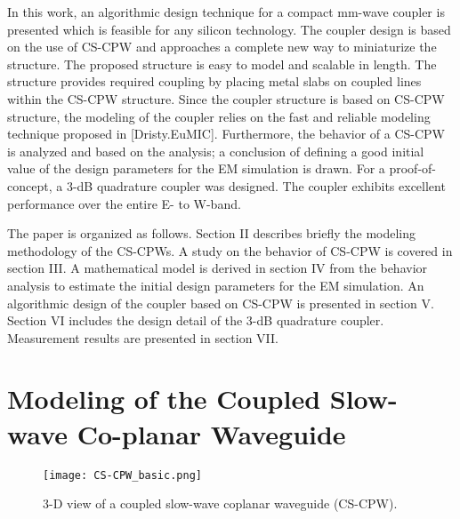 \documentclass[journal]{IEEEtran}
\begin{document}
In this work, an algorithmic design technique for a compact mm-wave coupler is presented which is feasible for any silicon technology. The coupler design is based on the use of CS-CPW and approaches a complete new way to miniaturize the structure. The proposed structure is easy to model and scalable in length. The structure provides required coupling by placing metal slabs on coupled lines within the CS-CPW structure. Since the coupler structure is based on CS-CPW structure, the modeling of the coupler relies on the fast and reliable modeling technique proposed in [Dristy.EuMIC]. Furthermore, the behavior of a CS-CPW is analyzed and based on the analysis; a conclusion of defining a good initial value of the design parameters for the EM simulation is drawn. For a proof-of-concept, a 3-dB quadrature coupler was designed. The coupler exhibits excellent performance over the entire E- to W-band.   

The paper is organized as follows. Section II describes briefly the modeling methodology of the CS-CPWs. A study on the behavior of CS-CPW is covered in section III. A mathematical model is derived in section IV from the behavior analysis to estimate the initial design parameters for the EM simulation. An algorithmic design of the coupler based on CS-CPW is presented in section V. Section VI includes the design detail of the 3-dB quadrature coupler. Measurement results are presented in section VII.



\section{Modeling of the Coupled Slow-wave Co-planar Waveguide}

\begin{figure}
	\texttt{[image: CS-CPW\_basic.png]}
	\caption{3-D view of a coupled slow-wave coplanar waveguide (CS-CPW).}
	\label{basic_CS_CPW}
\end{figure}
\end{document}
